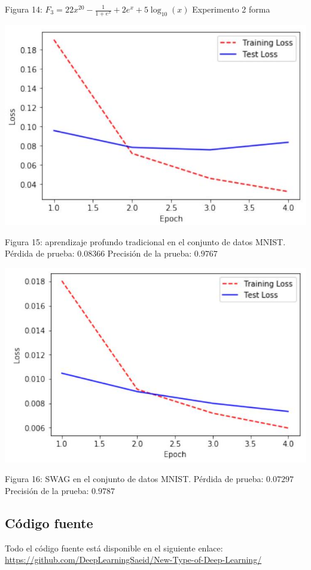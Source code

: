 \documentclass[10pt]{article}
\begin{document}
Figura 14: $F_{3}=22 x^{20}-\frac{1}{1+e^{x}}+2 e^{x}+5 \log _{10}(x)$ Experimento 2 forma

\includegraphics[max width=\textwidth]{2022_09_28_0067ec14010042dbf918g-14}

Figura 15: aprendizaje profundo tradicional en el conjunto de datos MNIST. Pérdida de prueba: $0.08366$ Precisión de la prueba: $0.9767$

\includegraphics[max width=\textwidth]{2022_09_28_0067ec14010042dbf918g-14(1)}

Figura 16: SWAG en el conjunto de datos MNIST. Pérdida de prueba: $0.07297$ Precisión de la prueba: $0.9787$

\subsection{Código fuente}
Todo el código fuente está disponible en el siguiente enlace: \href{https://github.com/}{https://github.com/DeepLearningSaeid/New-Type-of-Deep-Learning/}
\end{document}

